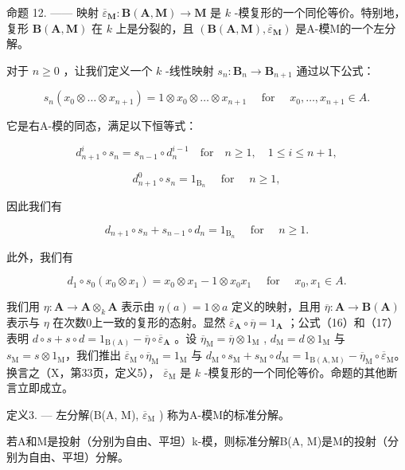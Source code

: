命题 12. —— 映射 \(\overline{\varepsilon}_{\mathbf{M}}: \mathbf{B}(\mathbf{A}, \mathbf{M}) \to \mathbf{M}\) 是 \(k\) -模复形的一个同伦等价。特别地，复形 \(\mathbf{B}(\mathbf{A}, \mathbf{M})\) 在 \(k\) 上是分裂的，且 \((\mathbf{B}(\mathbf{A}, \mathbf{M}), \overline{\varepsilon}_{\mathbf{M}})\) 是A-模M的一个左分解。

对于 \(n \geqslant 0\) ，让我们定义一个 \(k\) -线性映射 \(s_n: \mathbf{B}_n \to \mathbf{B}_{n+1}\) 通过以下公式：

\[
s _ {n} \left(x _ {0} \otimes \dots \otimes x _ {n + 1}\right) = 1 \otimes x _ {0} \otimes \dots \otimes x _ {n + 1} \quad \text { for } \quad x _ {0}, \dots , x _ {n + 1} \in A.
\]

它是右A-模的同态，满足以下恒等式：

\[
d _ {n + 1} ^ {i} \circ s _ {n} = s _ {n - 1} \circ d _ {n} ^ {i - 1} \quad \mathrm{for} \quad n \geqslant 1, \quad 1 \leqslant i \leqslant n + 1,
\]

\[
d _ {n + 1} ^ {0} \circ s _ {n} = 1 _ {\mathrm{B} _ {n}} \quad \text { for } \quad n \geqslant 1,
\]

因此我们有

\[
d _ {n + 1} \circ s _ {n} + s _ {n - 1} \circ d _ {n} = 1 _ {\mathrm{B} _ {n}} \quad \text { for } \quad n \geqslant 1.\tag{16}
\]

此外，我们有

\[
d _ {1} \circ s _ {0} (x _ {0} \otimes x _ {1}) = x _ {0} \otimes x _ {1} - 1 \otimes x _ {0} x _ {1} \quad \text { for } \quad x _ {0}, x _ {1} \in A.\tag{17}
\]

我们用 \(\eta: \mathbf{A} \to \mathbf{A} \otimes_k \mathbf{A}\) 表示由 \(\eta(a) = 1 \otimes a\) 定义的映射，且用 \(\overline{\eta}: \mathbf{A} \to \mathbf{B}(\mathbf{A})\) 表示与 \(\eta\) 在次数0上一致的复形的态射。显然 \(\overline{\varepsilon}_{\mathbf{A}} \circ \overline{\eta} = 1_{\mathbf{A}}\) ；公式（16）和（17）表明 \(d \circ s + s \circ d = 1_{\mathrm{B(A)}} - \overline{\eta} \circ \overline{\varepsilon}_{\mathbf{A}}\) 。设 \(\overline{\eta}_{\mathrm{M}} = \overline{\eta} \otimes 1_{\mathrm{M}}\) , \(d_{\mathrm{M}} = d \otimes 1_{\mathrm{M}}\) 与 \(s_{\mathrm{M}} = s \otimes 1_{\mathrm{M}}\)，我们推出 \(\overline{\varepsilon}_{\mathrm{M}} \circ \overline{\eta}_{\mathrm{M}} = 1_{\mathrm{M}}\) 与 \(d_{\mathrm{M}} \circ s_{\mathrm{M}} + s_{\mathrm{M}} \circ d_{\mathrm{M}} = 1_{\mathrm{B(A,M)}} - \overline{\eta}_{\mathrm{M}} \circ \overline{\varepsilon}_{\mathrm{M}}\)。换言之（X，第33页，定义5）， \(\overline{\varepsilon}_{\mathrm{M}}\) 是 \(k\) -模复形的一个同伦等价。命题的其他断言立即成立。

定义3. --- 左分解(B(A, M), \(\overline{\varepsilon}_{\mathrm{M}}\) ) 称为A-模M的标准分解。

若A和M是投射（分别为自由、平坦）k-模，则标准分解B(A, M)是M的投射（分别为自由、平坦）分解。


